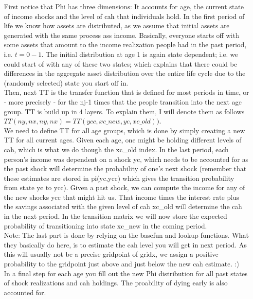 \documentclass[12pt,a4paper]{article}
\begin{document}
First notice that Phi has three dimensions: It accounts for age, the current state of income shocks and the level of cah that individuals hold. In the first period of life we know how assets are distributed, as we assume that initial assets are generated with the same process ass income. Basically, everyone starts off with some assets that amount to the income realization people had in the past period, i.e. $t=0-1$. The initial distribution at age 1 is again state dependent; i.e. we could start of with any of these two states; which explains that there could be differences in the aggregate asset distribution over the entire life cycle due to the (randomly selected) state you start off in. \\

Then, next TT is the transfer function that is defined for most periods in time, or - more precisely - for the nj-1 times that the people transition into the next age group. TT is build up in 4 layers. To explain them, I will denote them as follows $TT(ny,nx,ny,nx)=TT(ycc, xc\_new,yc,xc\_old))$.\\

We need to define TT for all age groups, which is done by simply creating a new TT for all current ages. Given each age, one might be holding different levels of cah, which is what we do though the xc\_old index. In the last period, each person's income was dependent on a shock yc, which needs to be accounted for as the past shock will determine the probability of one's next shock (remember that these estimates are stored in pi(yc,ycc) which gives the transition probability from state yc to ycc). Given a past shock, we can compute the income for any of the new shocks ycc that might hit us.  That income times the interest rate plus the savings associated with the given level of cah xc\_old will determine the cah in the next period. In the transition matrix we will now store the expected probability of transitioning into state xc\_new in the coming period. \\

Note: The last part is done by relying on the basefun and lookup functions. What they basically do here, is to estimate the cah level you will get in next period. As this will usually not be a precise gridpoint of gridx, we assign a positive probability to the gridpoint just above and just below the new cah estimate. :) \\

In a final step for each age you fill out the new Phi distribution for all past states of shock realizations and cah holdings. The proability of dying early is also accounted for.\\
\end{document}
